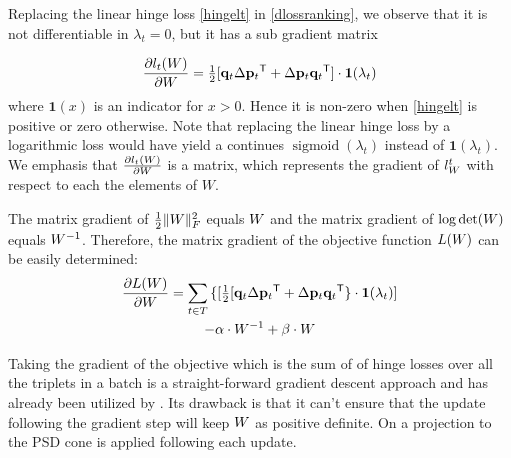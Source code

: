 \documentclass{article}
\begin{document}
Replacing the linear hinge loss \eqref{hingelt} in
\eqref{dlossranking}, we observe that it is not differentiable in
$\lambda_t = 0$, but it has a sub gradient matrix

\begin{equation}
  \frac{\partial {l_t ({W})}}{\partial {W}} =
  \tfrac{1}{2}[{\mathbf{q}}_{t}\Delta{\mathbf{p}}_{t}{}^\mathsf{T} + \Delta{\mathbf{p}}_{t}{\mathbf{q}}_{t}{}^\mathsf{T}] \cdot
  \textbf{1}(\lambda_t)
\end{equation}
where $\textbf{1}(x)$ is an indicator for $x>0$. Hence it is non-zero
when \eqref{hingelt} is positive or zero otherwise. Note that
replacing the linear hinge loss by a logarithmic loss would have yield
a continues $\operatorname{sigmoid}(\lambda_t)$ instead of
$\textbf{1}(\lambda_t)$.  We emphasis that $\frac{\partial {l_t
({W})}}{\partial {W}}$ is a matrix, which represents the gradient of
$l_{{W}}^{t}$ with respect to each the elements of $W$.

The matrix gradient of $\tfrac{1}{2} \| {W} \|_{F}^{2}$ equals ${W}$ and
the matrix gradient of $\log \det({W})$ equals ${W}^{-1}$. Therefore,
the matrix gradient of the objective function $L({W})$ can be easily
determined:
\begin{multline}
  \frac{\partial {L ({W})}}{\partial {W}} = \sum\limits_{t\in T}{\{
  [\tfrac{1}{2}[{\mathbf{q}}_{t}\Delta{\mathbf{p}}_{t}{}^\mathsf{T} + \Delta{\mathbf{p}}_{t}{\mathbf{q}}_{t}{}^\mathsf{T} \} } \cdot
  \textbf{1}(\lambda_t)] \\- \alpha \cdot {W}^{-1} + \beta \cdot {W}
  \label{gradMat}
\end{multline}

Taking the gradient of the objective which is the sum of of hinge
losses over all the triplets in a batch is a straight-forward gradient
descent approach and has already been utilized by \cite{qian}. Its
drawback is that it can't ensure that the update following the
gradient step will keep ${W}$ as positive definite. On \cite{qian} a
projection to the PSD cone is applied following each update.
\end{document}
